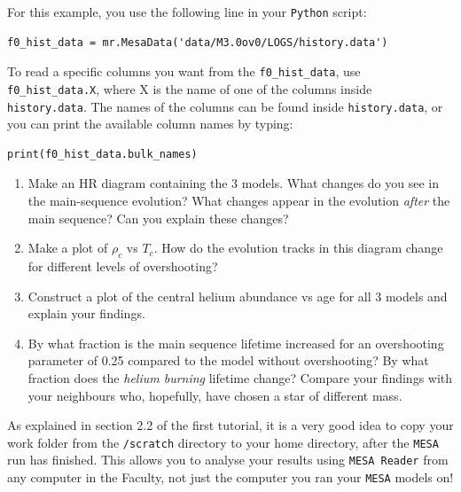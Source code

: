 \documentclass[11pt,a4paper]{article}
\begin{document}
\begin{enumerate}
For this example, you use the following line in your \texttt{Python} script:

\begin{lstlisting}[style=pythonstyle]
f0_hist_data = mr.MesaData('data/M3.0ov0/LOGS/history.data')
\end{lstlisting}


To read a specific columns you want from the \texttt{f0\_hist\_data}, use \texttt{f0\_hist\_data.X}, where X is the name of one of the columns inside \texttt{history.data}. 
The names of the columns can be found inside \texttt{history.data}, or you can print the available column names by typing: 

\begin{lstlisting}[style=pythonstyle]
print(f0_hist_data.bulk_names)
\end{lstlisting}

\begin{enumerate}

  \item Make an HR diagram containing the 3 models. What changes do you see in the main-sequence evolution? What changes appear in the evolution \emph{after} the main sequence? Can you explain these changes?

  \item Make a plot of $\rho_c$ vs $T_c$. How do the evolution tracks in this diagram change for different levels of overshooting?

  \item Construct a plot of the central helium abundance vs age for all 3 models and explain your findings. 

  \item By what fraction is the main sequence lifetime increased for an overshooting parameter of 0.25 compared to the model without overshooting? By what fraction does the \emph{helium burning} lifetime change? Compare your findings with your neighbours who, hopefully, have chosen a star of different mass.

\end{enumerate}

\end{enumerate}


\begin{tcolorbox}[protipbox]
As explained in section 2.2 of the first tutorial, it is a very good idea to copy your work folder from the \verb|/scratch| directory to your home directory, after the \texttt{MESA} run has finished. This allows you to analyse your results using \texttt{MESA Reader} from any computer in the Faculty, not just the computer you ran your \texttt{MESA} models on! 
\end{tcolorbox}
\end{document}
